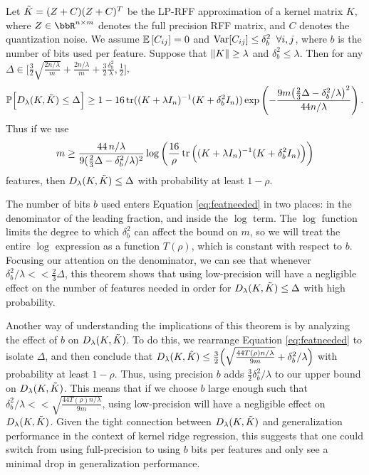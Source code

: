 \begin{theorem}
	Let $\tilde{K} = (Z+C)(Z+C)^T$ be the LP-RFF approximation of a kernel matrix $K$, where $Z\in\RR^{n\times m}$ denotes the full precision RFF matrix, and $C$ denotes the quantization noise.  We assume $\expect{}{C_{ij}} = 0$ and ${\rm Var}[C_{ij}] \leq \delta_b^2 \;\;\forall i,j$, where $b$ is the number of bits used per feature. Suppose that $\|K\| \geq \lambda$ and $\delta^2_b \leq \lambda$. Then for any $\Delta \in \Big[\frac{3}{2}\sqrt{\frac{2n/\lambda}{m}} + \frac{2n/\lambda}{m} + \frac{3}{2}\frac{\delta^2_b}{\lambda}, \frac{1}{2} \Big]$,
	\begin{equation*}
	\mathbb{P}\Big[D_{\lambda}(K,\tilde{K}) \leq \Delta\Big] \geq 1 - 16 \mathop{\rm tr}((K + \lambda I_n)^{-1} (K + \delta^2_b I_n)) \exp \left( -\frac{9m \big(\frac{2}{3}\Delta - \delta^2_b / \lambda\big)^2}{44n/\lambda} \right).
	\end{equation*}
	Thus if we use 
	\begin{equation}
	\label{eq:featneeded}
	m \geq \frac{44\, n/\lambda}{9(\frac{2}{3}\Delta - \delta_b^2/\lambda)^{2}} \log \bigg(\frac{16}{\rho} \mathop{\rm tr}\Big((K + \lambda I_n)^{-1} (K + \delta^2_b I_n)\Big) \bigg)
	\end{equation}
	features, then $D_\lambda(K,\tilde{K})\leq \Delta$  with probability at least $1 - \rho$.
\end{theorem}

The number of bits $b$ used enters Equation \ref{eq:featneeded} in two places: in the denominator of the leading fraction, and inside the $\log$ term. The $\log$ function limits the degree to which $\delta_b^2$ can affect the bound on $m$, so we will treat the entire $\log$ expression as a function $T(\rho)$, which is constant with respect to $b$.  Focusing our attention on the denominator, we can see that whenever $\delta_b^2/\lambda << \frac{2}{3}\Delta$, this theorem shows that using low-precision will have a negligible effect on the number of features needed in order for $D_{\lambda}(K,\tilde{K}) \leq \Delta$ with high probability. 

Another way of understanding the implications of this theorem is by analyzing the effect of $b$ on $D_{\lambda}(K,\tilde{K})$. To do this, we rearrange Equation \ref{eq:featneeded} to isolate $\Delta$, and then conclude that $D_{\lambda}(K,\tilde{K}) \leq \frac{3}{2} \Big(\sqrt{\frac{44T(\rho)n/\lambda}{9m}} + \delta_b^2/\lambda\Big)$ with probability at least $1-\rho$.  Thus, using precision $b$ adds $\frac{3}{2}\delta_b^2/\lambda$ to our upper bound on $D_{\lambda}(K,\tilde{K})$.  This means that if we choose $b$ large enough such that $\delta_b^2/\lambda << \sqrt{\frac{44T(\rho)n/\lambda}{9m}}$, using low-precision will have a negligible effect on $D_{\lambda}(K,\tilde{K})$.  Given the tight connection between $D_{\lambda}(K,\tilde{K})$ and generalization performance in the context of kernel ridge regression, this suggests that one could switch from using full-precision to using $b$ bits per features and only see a minimal drop in generalization performance.

